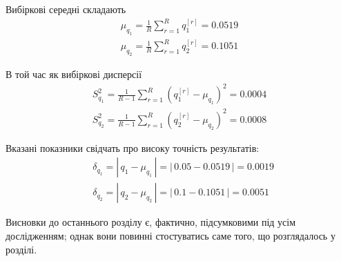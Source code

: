 Вибіркові середні складають
\begin{gather*}
    \mu_{q_1} = \frac{1}{R} \sum\limits_{r=1}^R q^{[r]}_1 = 0.0519 \\
    \mu_{q_2} = \frac{1}{R} \sum\limits_{r=1}^R q^{[r]}_2 = 0.1051 
\end{gather*}

В той час як вибіркові дисперсії
\begin{gather*}
    S^2_{q_1} = \frac{1}{R-1} \sum\limits_{r=1}^R \left( q^{[r]}_1 - \mu_{q_1} \right)^2 = 0.0004 \\
    S^2_{q_2} = \frac{1}{R-1} \sum\limits_{r=1}^R \left( q^{[r]}_2 - \mu_{q_2} \right)^2 = 0.0008 
\end{gather*}

Вказані показники свідчать про високу точність результатів:
\begin{align*}
    &\delta_{q_1} = \left|\, q_1-\mu_{q_1}\, \right| = \left|\, 0.05-0.0519\, \right| = 0.0019 \\
    &\delta_{q_2} = \left|\, q_2-\mu_{q_2}\, \right| = \left|\, 0.1-0.1051\, \right| = 0.0051
\end{align*}

\chapconclude{\ref{chap: practice}}

Висновки до останнього розділу є, фактично, підсумковими під усім 
дослідженням; однак вони повинні стостуватись саме того, що розглядалось у 
розділі.